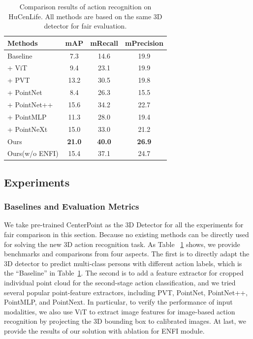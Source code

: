 \begin{table}[ht]
\caption{Comparison results of action recognition on HuCenLife. All methods are based on the same 3D detector for fair evaluation.}
\label{tab:actioncompare}
\begin{tabular}{l|ccc}

\hline
\multicolumn{1}{l|}{Methods} & mAP  & mRecall & mPrecision \\ \hline
Baseline & 7.3  & 14.6 & 19.9\\\hline
+ ViT\cite{dosovitskiy2020image}                          & 9.4  & 23.1 & 19.9  \\ \hline

+ PVT\cite{zhang2022pvt}                          & 13.2  & 30.5 & 19.8  \\
+ PointNet\cite{qi2017pointnet}                     & 8.4  & 26.3 & 15.5  \\
+ PointNet++\cite{qi2017pointnet++}              & 15.6  & 34.2 & 22.7  \\
+ PointMLP\cite{ma2022rethinking}                     & 11.3  & 28.0 & 19.4  \\
+ PointNeXt\cite{qian2022pointnext}                    & 15.0  & 33.0 & 21.2  \\ \hline

Ours                  & \textbf{21.0} & \textbf{40.0} & \textbf{26.9}  \\ 
Ours(w/o ENFI)         & 15.4  & 37.1 & 24.7  \\
\hline

\end{tabular}
\vspace{-3ex}
\end{table}



\subsection{Experiments}


\subsubsection{Baselines and Evaluation Metrics}
We take pre-trained CenterPoint as the 3D Detector for all the experiments for fair comparison in this section. Because no existing methods can be directly used for solving the new 3D action recognition task. As Table ~\ref{tab:actioncompare} shows, we provide benchmarks and comparisons from four aspects. The first is to directly adapt the 3D detector to predict multi-class persons with different action labels, which is the ``Baseline'' in Table~\ref{tab:actioncompare}. The second is to add a feature extractor for cropped individual point cloud for the second-stage action classification, and we tried several popular point-feature extractors, including PVT, PointNet, PointNet++, PointMLP, and PointNext. In particular, to verify the performance of input modalities, we also use ViT to extract image features for image-based action recognition by projecting the 3D bounding box to calibrated images. At last, we provide the results of our solution with ablation for ENFI module. 

